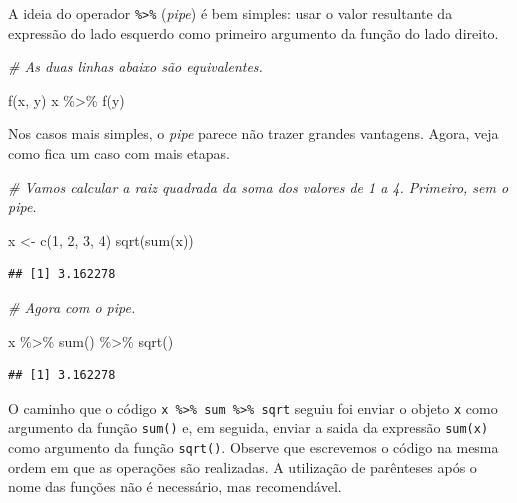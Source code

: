 \documentclass[
]{book}
\newenvironment{Shaded}{\begin{snugshade}}{\end{snugshade}}
\newcommand{\CommentTok}[1]{\textcolor[rgb]{0.56,0.35,0.01}{\textit{#1}}}
\newcommand{\DecValTok}[1]{\textcolor[rgb]{0.00,0.00,0.81}{#1}}
\newcommand{\FunctionTok}[1]{\textcolor[rgb]{0.00,0.00,0.00}{#1}}
\newcommand{\NormalTok}[1]{#1}
\newcommand{\OtherTok}[1]{\textcolor[rgb]{0.56,0.35,0.01}{#1}}
\newcommand{\SpecialCharTok}[1]{\textcolor[rgb]{0.00,0.00,0.00}{#1}}
\begin{document}
A ideia do operador \texttt{\%\textgreater{}\%} (\emph{pipe}) é bem simples: usar o valor resultante da expressão do lado esquerdo como primeiro argumento da função do lado direito.

\begin{Shaded}
\begin{Highlighting}[]
\CommentTok{\# As duas linhas abaixo são equivalentes.}

\FunctionTok{f}\NormalTok{(x, y)}
\NormalTok{x }\SpecialCharTok{\%\textgreater{}\%} \FunctionTok{f}\NormalTok{(y)}
\end{Highlighting}
\end{Shaded}

Nos casos mais simples, o \emph{pipe} parece não trazer grandes vantagens. Agora, veja como fica um caso com mais etapas.

\begin{Shaded}
\begin{Highlighting}[]
\CommentTok{\# Vamos calcular a raiz quadrada da soma dos valores de 1 a 4. Primeiro, sem o pipe.}

\NormalTok{x }\OtherTok{\textless{}{-}} \FunctionTok{c}\NormalTok{(}\DecValTok{1}\NormalTok{, }\DecValTok{2}\NormalTok{, }\DecValTok{3}\NormalTok{, }\DecValTok{4}\NormalTok{)}
\FunctionTok{sqrt}\NormalTok{(}\FunctionTok{sum}\NormalTok{(x))}
\end{Highlighting}
\end{Shaded}

\begin{verbatim}
## [1] 3.162278
\end{verbatim}

\begin{Shaded}
\begin{Highlighting}[]
\CommentTok{\# Agora com o pipe.}

\NormalTok{x }\SpecialCharTok{\%\textgreater{}\%} \FunctionTok{sum}\NormalTok{() }\SpecialCharTok{\%\textgreater{}\%} \FunctionTok{sqrt}\NormalTok{()}
\end{Highlighting}
\end{Shaded}

\begin{verbatim}
## [1] 3.162278
\end{verbatim}

O caminho que o código \texttt{x\ \%\textgreater{}\%\ sum\ \%\textgreater{}\%\ sqrt} seguiu foi enviar o objeto \texttt{x} como argumento da função \texttt{sum()} e, em seguida, enviar a saida da expressão \texttt{sum(x)} como argumento da função \texttt{sqrt()}. Observe que escrevemos o código na mesma ordem em que as operações são realizadas. A utilização de parênteses após o nome das funções não é necessário, mas recomendável.
\end{document}
